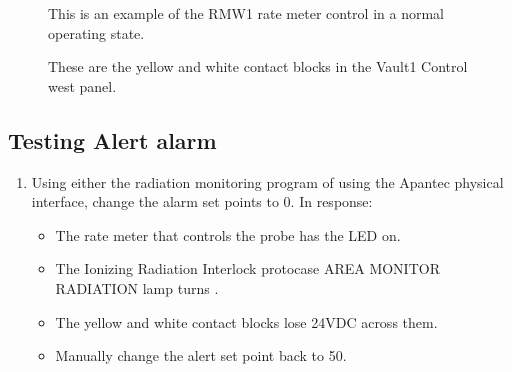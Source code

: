 \documentclass[letterpaper,10pt,english]{sphinxmanual}
\begin{document}
\begin{figure}[htbp]
\centering
\capstart

\noindent{}
\caption{ This is an example of the RMW1 rate meter control in a normal operating state.}\label{\detokenize{testing_documentation/apantec_testing:id1}}\end{figure}

\begin{figure}[htbp]
\centering
\capstart

\noindent{}
\caption{ These are the yellow and white contact blocks in the Vault\sphinxhyphen{}1 Control west panel.}\label{\detokenize{testing_documentation/apantec_testing:id2}}\end{figure}


\subsection{Testing Alert alarm}
\label{\detokenize{testing_documentation/apantec_testing:testing-alert-alarm}}\begin{enumerate}
%
\item {} 
\sphinxAtStartPar
Using either the radiation monitoring program of using the Apantec physical interface, change the alarm set points to 0.
In response:
\begin{itemize}
\item {} 
\sphinxAtStartPar
The rate meter that controls the probe has the  LED on.

\item {} 
\sphinxAtStartPar
The Ionizing Radiation Interlock protocase AREA MONITOR RADIATION lamp turns .

\item {} 
\sphinxAtStartPar
The yellow and white contact blocks lose 24VDC across them.

\item {} 
\sphinxAtStartPar
Manually change the alert set point back to 50.

\end{itemize}

\end{enumerate}
\end{document}
